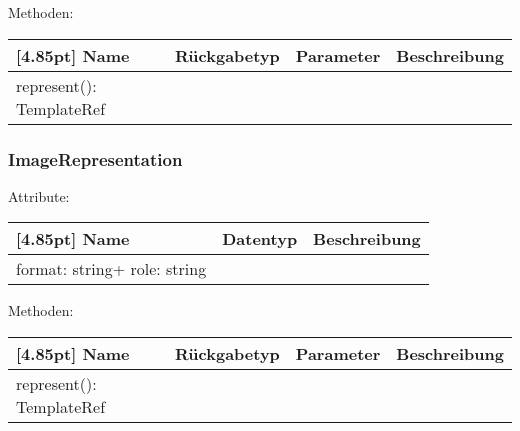                 Methoden:
        		\begin{center}
                \setlength\tabcolsep{5pt}
                	\renewcommand{\arraystretch}{1.5}
                    	\begin{tabularx}{\textwidth}{|l|l|l|X|}
                    	\hline
                    	\rowcolor[gray]{0.75}[4.85pt]
                		Name & Rückgabetyp & Parameter & Beschreibung \\ \hline
                		represent(): TemplateRef
                        & & &  \\ \hline
                        \end{tabularx}
        		\end{center}
        	
        	\subsubsection{ImageRepresentation}
        	
        	    Attribute:
                \begin{center}
                	\renewcommand{\arraystretch}{1.5}
                    \setlength\tabcolsep{5pt}
                	\begin{tabularx}{\textwidth}{|l|l|X|}
                		\hline
                        \rowcolor[gray]{0.75}[4.85pt]            		
                        Name & Datentyp & Beschreibung \\ \hline
                        format: string+ role: string
                        & &  \\ \hline
                	\end{tabularx}
                \end{center}
                
                Methoden:
        		\begin{center}
                \setlength\tabcolsep{5pt}
                	\renewcommand{\arraystretch}{1.5}
                    	\begin{tabularx}{\textwidth}{|l|l|l|X|}
                    	\hline
                    	\rowcolor[gray]{0.75}[4.85pt]
                		Name & Rückgabetyp & Parameter & Beschreibung \\ \hline
                		represent(): TemplateRef
                        & & &  \\ \hline
                        \end{tabularx}
        		\end{center}
	

